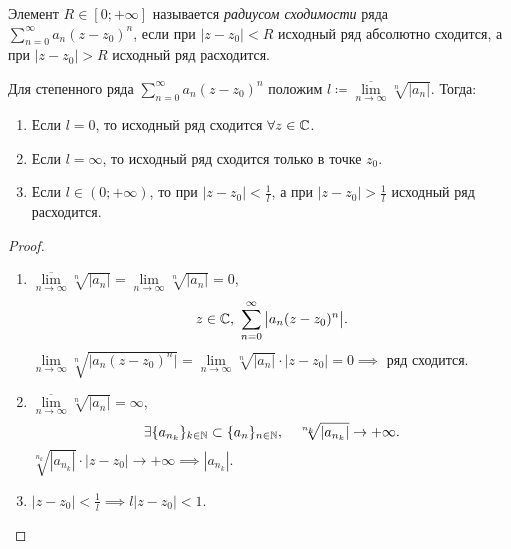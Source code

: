 \begin{definition}
    Элемент $ R \in [0;+\infty] $ называется \emph{радиусом сходимости} ряда $ \sum_{n=0}^{\infty}a_n(z-z_0)^n $, если при $ | z - z_0 | < R $ исходный ряд абсолютно сходится, а при $ | z-z_0 | > R $ исходный ряд расходится.
\end{definition}

\begin{theorem}
    Для степенного ряда $ \sum_{n=0}^{\infty}a_n(z-z_0)^n $ положим $ l \coloneqq \underset{n \rightarrow\infty}{\overline{\lim}} \sqrt[n]{| a_n |} $. Тогда:
    \begin{enumerate}
        \item Если $ l=0 $, то исходный ряд сходится $ \forall z \in \mathbb{C} $.
        \item Если $ l=\infty $, то исходный ряд сходится только в точке $ z_0 $.
        \item Если $ l\in(0;+\infty) $, то при $ | z-z_0 | < \frac{1}{l} $, а при $ | z-z_0 | > \frac{1}{l} $ исходный ряд расходится.
    \end{enumerate}
\end{theorem}

\begin{proof}\leavevmode
    \begin{enumerate}
        \item $ \underset{n \rightarrow\infty}{\overline{\lim}} \sqrt[n]{| a_n |} = \underset{n \rightarrow\infty}{\lim} \sqrt[n]{| a_n |} = 0 $,
              \[
                  z \in \mathbb{C}, \ \sum_{n=0}^{\infty}\big| a_n(z-z_0)^n \big|.
              \]
              $ \underset{n \rightarrow \infty}{\lim} \sqrt[n]{\big| a_n(z-z_0)^n \big|} = \underset{n \rightarrow \infty}{\lim} \sqrt[n]{\big| a_n \big|} \cdot | z - z_0 | = 0 \implies $ ряд сходится.
        \item $ \underset{n \rightarrow\infty}{\overline{\lim}} \sqrt[n]{| a_n |} = \infty $,
              \[
                  \exists\{a_{n_k}\}_{k\in\mathbb{N}} \subset \{a_n\}_{n\in\mathbb{N}}, \quad \sqrt[n_k]{| a_{n_k} |} \rightarrow + \infty.
              \]
              $ \sqrt[n_k]{| a_{n_k} |} \cdot | z - z_0 | \rightarrow +\infty \implies | a_{n_k} | $.
        \item $ | z - z_0 | < \frac{1}{l} \implies l | z - z_0 | < 1 $.
    \end{enumerate}
\end{proof}
